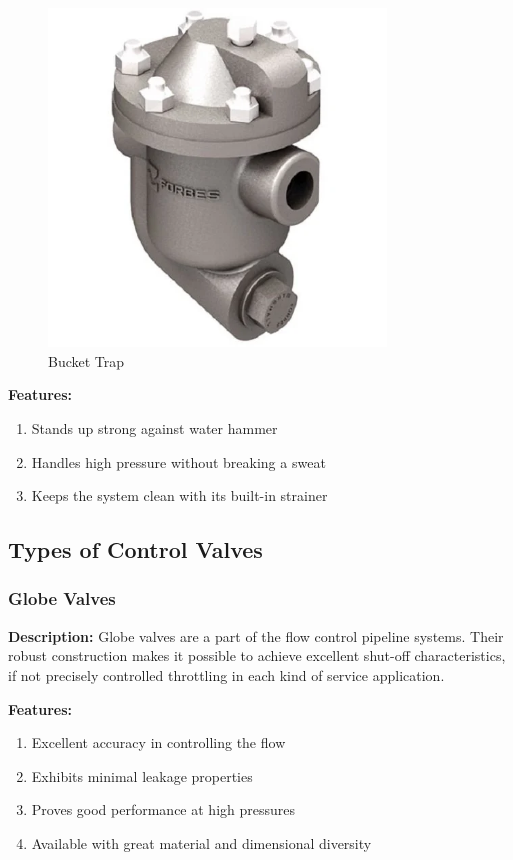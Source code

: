 \begin{figure}[h]
    \centering
    \includegraphics[width=0.8\textwidth,height=0.33\textheight,keepaspectratio]{figs/lastmin/bucket_trap.png}
    \caption{Bucket Trap}
    \label{fig:bucket_trap}
\end{figure}

\textbf{Features:}
\begin{enumerate}
    \item Stands up strong against water hammer
    \item Handles high pressure without breaking a sweat
    \item Keeps the system clean with its built-in strainer
\end{enumerate}

\subsection{Types of Control Valves}

\subsubsection{Globe Valves}
\textbf{Description:} Globe valves are a part of the flow control pipeline systems. Their robust construction makes it possible to achieve excellent shut-off characteristics, if not precisely controlled throttling in each kind of service application. 

\textbf{Features:}
\begin{enumerate}
    \item Excellent accuracy in controlling the flow
    \item Exhibits minimal leakage properties
    \item Proves good performance at high pressures
    \item Available with great material and dimensional diversity
\end{enumerate}

